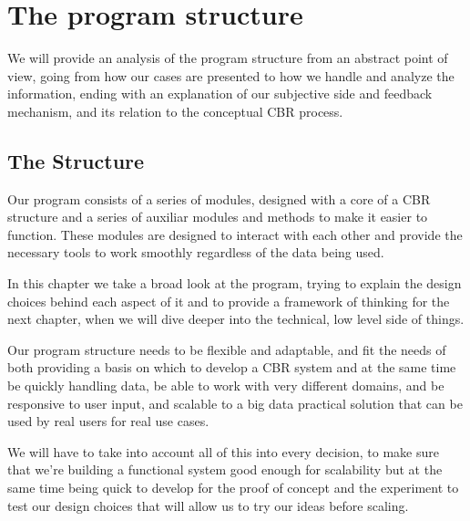 %
%

\chapter{The program structure}

\begin{resumen}
We will provide an analysis of the program structure from an abstract point of view, going from how our cases are presented to how we handle and analyze the information, ending with an explanation of our subjective side and feedback mechanism, and its relation to the conceptual CBR process.
\end{resumen}

\linespread{1.6}

\section{The Structure}
\label{cap2:sec:structure}

Our program consists of a series of modules, designed with a core of a CBR structure and a series of auxiliar modules and methods to make it easier to function. These modules are designed to interact with each other and provide the necessary tools to work smoothly regardless of the data being used.

In this chapter we take a broad look at the program, trying to explain the design choices behind each aspect of it and to provide a framework of thinking for the next chapter, when we will dive deeper into the technical, low level side of things.

Our program structure needs to be flexible and adaptable, and fit the needs of both providing a basis on which to develop a CBR system and at the same time be quickly handling data, be able to work with very different domains, and be responsive to user input, and scalable to a big data practical solution that can be used by real users for real use cases.

We will have to take into account all of this into every decision, to make sure that we're building a functional system good enough for scalability but at the same time being quick to develop for the proof of concept and the experiment to test our design choices that will allow us to try our ideas before scaling.

